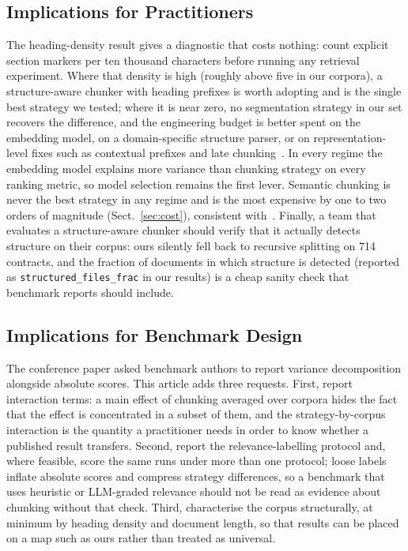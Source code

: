 \documentclass[runningheads]{llncs}
\begin{document}
\subsection{Implications for Practitioners}
The heading-density result gives a diagnostic that costs nothing: count explicit section markers per ten thousand characters before running any retrieval experiment. Where that density is high (roughly above five in our corpora), a structure-aware chunker with heading prefixes is worth adopting and is the single best strategy we tested; where it is near zero, no segmentation strategy in our set recovers the difference, and the engineering budget is better spent on the embedding model, on a domain-specific structure parser, or on representation-level fixes such as contextual prefixes and late chunking~\cite{anthropic2024contextual,gunther2024latechunking,conti2025conteb}. In every regime the embedding model explains more variance than chunking strategy on every ranking metric, so model selection remains the first lever. Semantic chunking is never the best strategy in any regime and is the most expensive by one to two orders of magnitude (Sect.~\ref{sec:cost}), consistent with~\cite{qu2025semantic}. Finally, a team that evaluates a structure-aware chunker should verify that it actually detects structure on their corpus: ours silently fell back to recursive splitting on 714 contracts, and the fraction of documents in which structure is detected (reported as \texttt{structured\_files\_frac} in our results) is a cheap sanity check that benchmark reports should include.

\subsection{Implications for Benchmark Design}
The conference paper asked benchmark authors to report variance decomposition alongside absolute scores. This article adds three requests. First, report interaction terms: a main effect of chunking averaged over corpora hides the fact that the effect is concentrated in a subset of them, and the strategy-by-corpus interaction is the quantity a practitioner needs in order to know whether a published result transfers. Second, report the relevance-labelling protocol and, where feasible, score the same runs under more than one protocol; loose labels inflate absolute scores and compress strategy differences, so a benchmark that uses heuristic or LLM-graded relevance should not be read as evidence about chunking without that check. Third, characterise the corpus structurally, at minimum by heading density and document length, so that results can be placed on a map such as ours rather than treated as universal.
\end{document}
